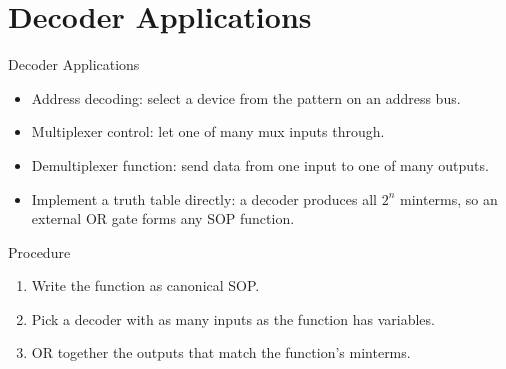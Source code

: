 \documentclass[9pt,aspectratio=169,xcolor=table]{beamer}
\begin{document}
\section{Decoder Applications}

\begin{frame}{Decoder Applications}
  \begin{itemize}\small\itemsep4pt
    \item \alert{Address decoding}: select a device from the pattern on an address bus.
    \item \alert{Multiplexer control}: let one of many mux inputs through.
    \item \alert{Demultiplexer function}: send data from one input to one of many outputs.
    \item \alert{Implement a truth table directly}: a decoder produces all $2^n$ minterms, so an external OR gate forms any SOP function.
  \end{itemize}
  \begin{block}{Procedure}
    \small
    \begin{enumerate}\itemsep1pt
      \item Write the function as canonical SOP.
      \item Pick a decoder with as many inputs as the function has variables.
      \item OR together the outputs that match the function's minterms.
    \end{enumerate}
  \end{block}
\end{frame}
\end{document}
